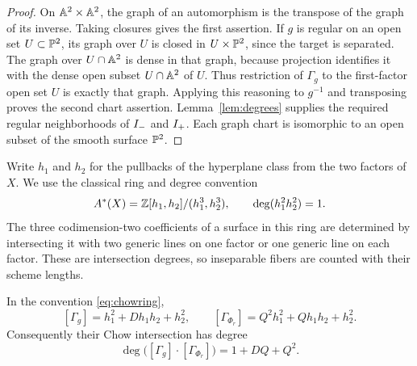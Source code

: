 \begin{proof}
On $\mathbb A^2\times\mathbb A^2$, the graph of an automorphism is the transpose of
the graph of its inverse. Taking closures gives the first assertion.
If $g$ is regular on an open set $U\subset\mathbb P^2$, its graph over $U$
is closed in $U\times\mathbb P^2$, since the target is separated. The graph
over $U\cap\mathbb A^2$ is dense in that graph, because projection identifies
it with the dense open subset $U\cap\mathbb A^2$ of $U$. Thus restriction of
$\Gamma_g$ to the first-factor open set $U$ is exactly that graph.
Applying this reasoning to $g^{-1}$ and transposing proves the second
chart assertion. Lemma~\ref{lem:degrees} supplies the required regular
neighborhoods of $I_{-}$ and $I_{+}$. Each graph chart is isomorphic to
an open subset of the smooth surface $\mathbb P^2$.
\end{proof}

Write $h_1$ and $h_2$ for the pullbacks of the hyperplane class from the
two factors of $X$. We use the classical ring and degree convention
\begin{equation}\label{eq:chowring}
 A^*(X)=\mathbb Z[h_1,h_2]/(h_1^3,h_2^3),\qquad
 \deg(h_1^2h_2^2)=1.
\end{equation}
The three codimension-two coefficients of a surface in this ring are
determined by intersecting it with two generic lines on one factor or
one generic line on each factor. These are intersection degrees,
so inseparable fibers are counted with their scheme lengths.

\begin{lemma}\label{lem:classes}
In the convention \eqref{eq:chowring},
\begin{equation}\label{eq:classes}
 [\Gamma_g]=h_1^2+D h_1h_2+h_2^2,
 \qquad
 [\Gamma_{\Phi_r}]=Q^2h_1^2+Qh_1h_2+h_2^2.
\end{equation}
Consequently their Chow intersection has degree
\begin{equation}\label{eq:total}
 \deg\bigl([\Gamma_g]\cdot[\Gamma_{\Phi_r}]\bigr)
 =1+DQ+Q^2.
\end{equation}
\end{lemma}

